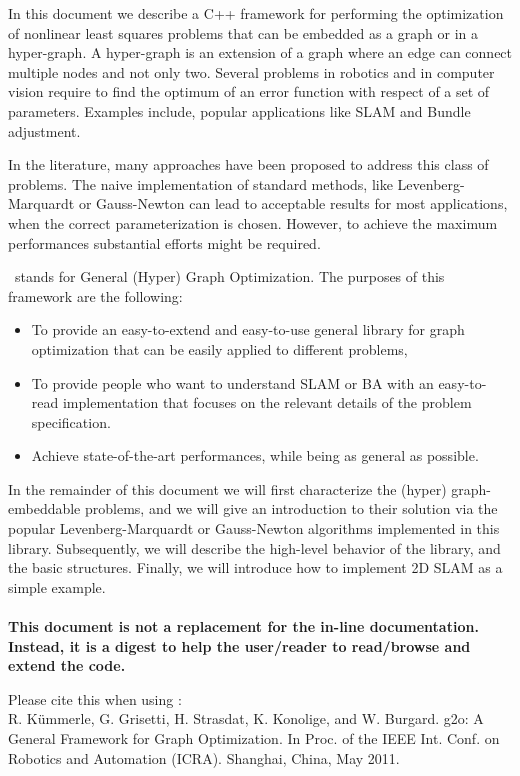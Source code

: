 \documentclass[a4paper]{article}
\begin{document}
In this document we describe a C++ framework for performing the
optimization of nonlinear least squares problems that can be embedded
as a graph or in a hyper-graph. A hyper-graph is an extension of a
graph where an edge can connect multiple nodes and not only two.
Several problems in robotics and in computer vision require to find
the optimum of an error function with respect of a set of parameters.
Examples include, popular applications like SLAM and Bundle
adjustment.

In the literature, many approaches have been proposed to address this
class of problems. The naive implementation of standard methods, like
Levenberg-Marquardt or Gauss-Newton can lead to acceptable results for
most applications, when the correct parameterization is
chosen. However, to achieve the maximum performances substantial
efforts might be required.

\gopt\ stands for General (Hyper) Graph Optimization. The purposes of
this framework are the following:
\begin{itemize}
\item To provide an easy-to-extend and easy-to-use general library for 
  graph optimization that can be easily applied to different problems,
\item To provide people who want to understand SLAM or BA with an
  easy-to-read implementation that focuses on the relevant details of
  the problem specification.
\item Achieve state-of-the-art performances, 
  while being as general as possible.
\end{itemize}

In the remainder of this document we will first characterize the
(hyper) graph-embeddable problems, and we will give an introduction to
their solution via the popular Levenberg-Marquardt or Gauss-Newton
algorithms implemented in this library.  Subsequently, we will
describe the high-level behavior of the library, and the basic
structures.  Finally, we will introduce how to implement 2D SLAM as a
simple example.\\
\vspace{.5cm}\\
\textbf{This document is not a replacement for the
  in-line documentation.  Instead, it is a digest to help the
  user/reader to read/browse and extend the code.}

  \vspace{.5cm}
\noindent Please cite this when using \gopt:\\
R. K\"ummerle, G. Grisetti, H. Strasdat, K. Konolige, and W. Burgard.
g2o: A General Framework for Graph Optimization. 
In Proc. of the IEEE Int. Conf. on Robotics and Automation (ICRA). Shanghai, China, May 2011. 
\end{document}
